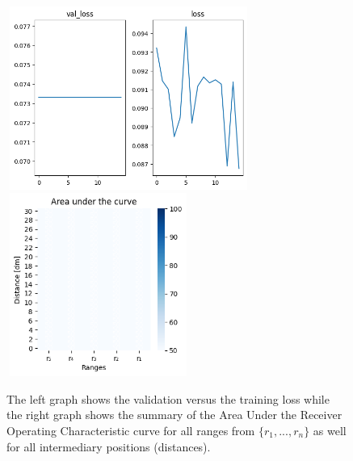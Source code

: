 \begin{multicols}{2}
\end{multicols}\begin{figure}[H]%
\centering
\includegraphics[width=8cm,height=6cm]{3_models/models_15/graph_15.png}
\hspace{0.2 cm}
\includegraphics[width=6cm,height=6cm]{4_plots/plots_15/AUC_15.png}
\caption{The left graph shows the validation versus the training loss while the right graph shows the summary of the Area Under the Receiver Operating Characteristic curve for all ranges from $\{r_{1}, ... ,r_{n}\}$ as well for all intermediary positions (distances).}
\label{auc_15}
\end{figure}


